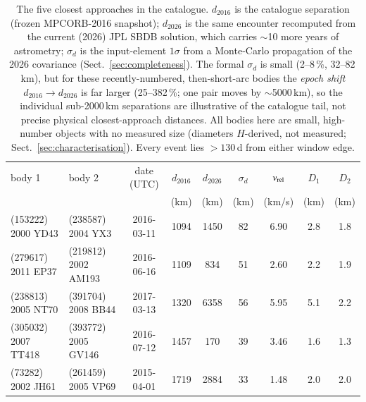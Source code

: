 \documentclass{aa}
\begin{document}
\begin{table}
\caption{The five closest approaches in the catalogue. $d_{2016}$ is the
catalogue separation (frozen MPCORB-2016 snapshot); $d_{2026}$ is the same
encounter recomputed from the current (2026) JPL SBDB solution, which carries
$\sim$10 more years of astrometry; $\sigma_d$ is the input-element $1\sigma$ from
a Monte-Carlo propagation of the 2026 covariance (Sect.~\ref{sec:completeness}).
The formal $\sigma_d$ is small (2--8\,\%, 32--82\,km), but for these
recently-numbered, then-short-arc bodies the \emph{epoch shift}
$d_{2016}\!\rightarrow\!d_{2026}$ is far larger (25--382\,\%; one pair moves by
$\sim$5000\,km), so the individual sub-2000\,km separations are illustrative of
the catalogue tail, not precise physical closest-approach distances. All bodies
here are small, high-number objects with no measured size (diameters $H$-derived,
not measured; Sect.~\ref{sec:characterisation}). Every event lies $>130$\,d from
either window edge.}
\label{tab:closest}
\centering
\small
\begin{tabular}{llccccccc}
\hline\hline
body 1 & body 2 & date (UTC) & $d_{2016}$ & $d_{2026}$ & $\sigma_d$ & $v_{\rm rel}$ & $D_1$ & $D_2$ \\
       &        &            & (km)       & (km)       & (km)       & (km/s)        & (km)  & (km)  \\
\hline
(153222) 2000 YD43  & (238587) 2004 YX3   & 2016-03-11 & 1094 & 1450 & 82 & 6.90 & 2.8 & 1.8 \\
(279617) 2011 EP37  & (219812) 2002 AM193 & 2016-06-16 & 1109 &  834 & 51 & 2.60 & 2.2 & 1.9 \\
(238813) 2005 NT70  & (391704) 2008 BB44  & 2017-03-13 & 1320 & 6358 & 56 & 5.95 & 5.1 & 2.2 \\
(305032) 2007 TT418 & (393772) 2005 GV146 & 2016-07-12 & 1457 &  170 & 39 & 3.46 & 1.6 & 1.3 \\
(73282) 2002 JH61   & (261459) 2005 VP69  & 2015-04-01 & 1719 & 2884 & 33 & 1.48 & 2.0 & 2.0 \\
\hline
\end{tabular}
\end{table}
\end{document}
